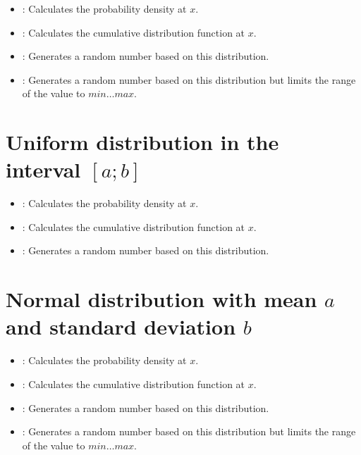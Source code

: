 \begin{itemize}

\item
{}:
Calculates the probability density at $x$.

\item
{}:
Calculates the cumulative distribution function at $x$.

\item
{}:
Generates a random number based on this distribution.

\item
{}:
Generates a random number based on this distribution but limits the range of the value to $min\ldots max$.

\end{itemize}



\section{Uniform distribution in the interval \texorpdfstring{$[a;b]$}{[a;b]}}

\begin{itemize}

\item
{}:
Calculates the probability density at $x$.

\item
{}:
Calculates the cumulative distribution function at $x$.

\item
{}:
Generates a random number based on this distribution.

\end{itemize}



\section{Normal distribution with mean \texorpdfstring{$a$}{a} and standard deviation \texorpdfstring{$b$}{b}}

\begin{itemize}

\item
{}:
Calculates the probability density at $x$.

\item
{}:
Calculates the cumulative distribution function at $x$.

\item
{}:
Generates a random number based on this distribution.

\item
{}:
Generates a random number based on this distribution but limits the range of the value to $min\ldots max$.

\end{itemize}



